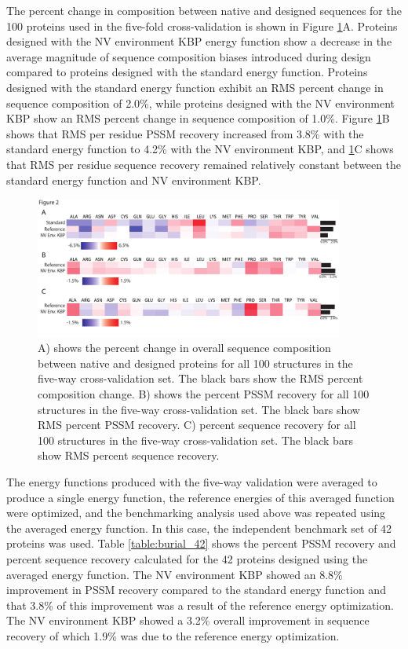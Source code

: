 The percent change in composition between native and designed sequences for the 100 proteins used in the five-fold cross-validation is shown in Figure \ref{fig:overall_crossval_changes}A.
Proteins designed with the NV environment KBP energy function show a decrease in the average magnitude of sequence composition biases introduced during design compared to proteins designed with the standard energy function.
Proteins designed with the standard energy function exhibit an RMS percent change in sequence composition of 2.0\%, while proteins designed with the NV environment KBP show an RMS percent change in sequence composition of 1.0\%.
Figure \ref{fig:overall_crossval_changes}B shows that RMS per residue PSSM recovery increased from 3.8\% with the standard energy function to 4.2\% with the NV environment KBP, and \ref{fig:overall_crossval_changes}C shows that RMS per residue sequence recovery remained relatively constant between the standard energy function and NV environment KBP. 

\begin{figure}
\centering
\includegraphics[width=4in]{figures/nv_kbp/overall_crossval_changes}
\caption{
A) shows the percent change in overall sequence composition between native and designed proteins for all 100 structures in the five-way cross-validation set.
The black bars show the RMS percent composition change.
B) shows the percent PSSM recovery for all 100 structures in the five-way cross-validation set.  The black bars show RMS percent PSSM recovery.
C) percent sequence recovery for all 100 structures in the five-way cross-validation set.  The black bars show RMS percent sequence recovery.	
}
\label{fig:overall_crossval_changes}
\end{figure}


The energy functions produced with the five-way validation were averaged to produce a single energy function, the reference energies of this averaged function were optimized, and the benchmarking analysis used above was repeated using the averaged energy function.
In this case, the independent benchmark set of 42 proteins was used.
Table \ref{table:burial_42} shows the percent PSSM recovery and percent sequence recovery calculated for the 42 proteins designed using the averaged energy function.
The NV environment KBP showed an 8.8\% improvement in PSSM recovery compared to the standard energy function and that 3.8\% of this improvement was a result of the reference energy optimization.
The NV environment KBP showed a 3.2\% overall improvement in sequence recovery of which 1.9\% was due to the reference energy optimization. 

